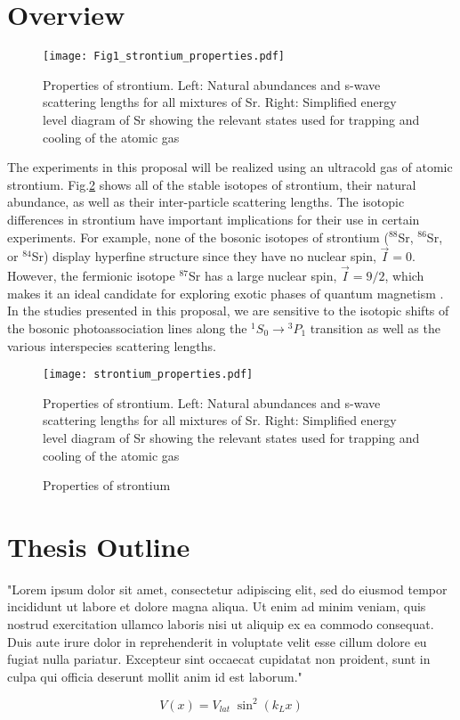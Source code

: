\section{Overview \label{sec:overview}}
	\begin{figure}
		\centerline{
		\texttt{[image: Fig1\_strontium\_properties.pdf]}}
		\caption{Properties of strontium. Left: Natural abundances and s-wave scattering lengths for all mixtures of Sr. Right: Simplified energy level diagram of Sr showing the relevant states used for trapping and cooling of the atomic gas}
		\label{fig:energy_level_diagram}
	\end{figure} 
The experiments in this proposal will be realized using an ultracold gas of atomic strontium. Fig.\;\ref{fig:energy_level_diagram} shows all of the stable isotopes of strontium, their natural abundance, as well as their inter-particle scattering lengths. The isotopic differences in strontium have important implications for their use in certain experiments. For example, none of the bosonic isotopes of strontium ($^{88}$Sr, $^{86}$Sr, or $^{84}$Sr) display hyperfine structure since they have no nuclear spin, $\vec{I}=0$. However, the fermionic isotope $^{87}$Sr has a large nuclear spin, $\vec{I}=9/2$, which makes it an ideal candidate for exploring exotic phases of quantum magnetism \cite{Beverland2016,Cazalilla2014,Chen2015}. In the studies presented in this proposal, we are sensitive to the isotopic shifts of the bosonic photoassociation lines along the $^1S_0\!\rightarrow\!^3P_1$ transition as well as the various interspecies scattering lengths.

\begin{figure}
\label{fig:energy_level_diagram}
	\centerline{
	\texttt{[image: strontium\_properties.pdf]}}
	\caption{Properties of strontium}{Properties of strontium. Left: Natural abundances and s-wave scattering lengths for all mixtures of Sr. Right: Simplified energy level diagram of Sr showing the relevant states used for trapping and cooling of the atomic gas}
\end{figure} 

\section{Thesis Outline}
\label{sec:outline}

"Lorem ipsum dolor sit amet, consectetur adipiscing elit, sed do eiusmod tempor incididunt ut labore et dolore magna aliqua. Ut enim ad minim veniam, quis nostrud exercitation ullamco laboris nisi ut aliquip ex ea commodo consequat. Duis aute irure dolor in reprehenderit in voluptate velit esse cillum dolore eu fugiat nulla pariatur. Excepteur sint occaecat cupidatat non proident, sunt in culpa qui officia deserunt mollit anim id est laborum."


\begin{equation} 
\label{eq:1dlattice}
		 V(x) = V_{lat} \; \sin^2(k_L x)
\end{equation}



